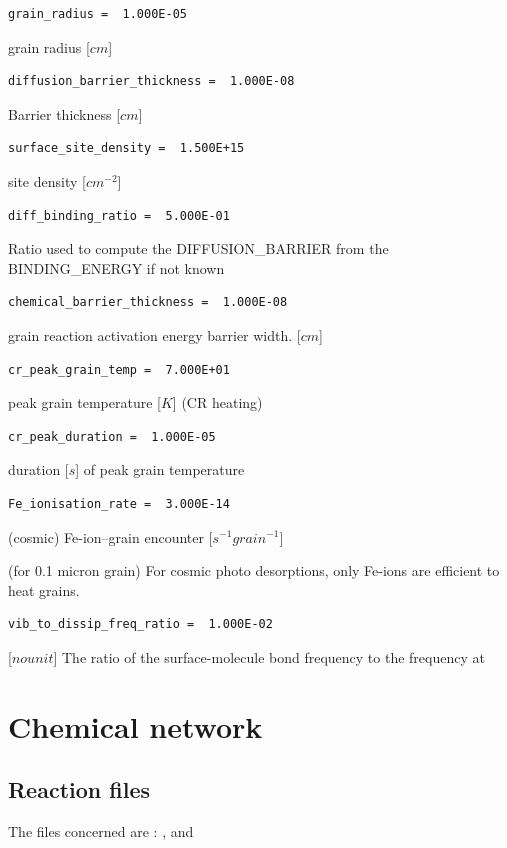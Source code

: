 \documentclass[english,a4paper,twoside]{article}
\begin{document}
\begin{verbatim}
grain_radius =  1.000E-05
\end{verbatim}
grain radius [$\unit{cm}$]

\begin{verbatim}
diffusion_barrier_thickness =  1.000E-08
\end{verbatim}
Barrier thickness [$\unit{cm}$]

\begin{verbatim}
surface_site_density =  1.500E+15
\end{verbatim}
site density [$\unit{cm^{-2}}$]

\begin{verbatim}
diff_binding_ratio =  5.000E-01
\end{verbatim}
Ratio used to compute the DIFFUSION\_BARRIER from the BINDING\_ENERGY if not known

\begin{verbatim}
chemical_barrier_thickness =  1.000E-08
\end{verbatim}
grain reaction activation energy barrier width. [$\unit{cm}$]

\begin{verbatim}
cr_peak_grain_temp =  7.000E+01
\end{verbatim}
peak grain temperature [$\unit{K}$] (CR heating)

\begin{verbatim}
cr_peak_duration =  1.000E-05
\end{verbatim}
duration [$\unit{s}$] of peak grain temperature

\begin{verbatim}
Fe_ionisation_rate =  3.000E-14
\end{verbatim}
(cosmic) Fe-ion--grain encounter [$\unit{s^{-1} grain^{-1}}$] 

(for 0.1 micron grain) For cosmic photo desorptions, only Fe-ions are efficient to heat grains. 

\begin{verbatim}
vib_to_dissip_freq_ratio =  1.000E-02
\end{verbatim}
[$\unit{no unit}$] The ratio of the surface-molecule bond frequency to the frequency at

\section{Chemical network}
\subsection{Reaction files}
The files concerned are : ,  and 
\end{document}
